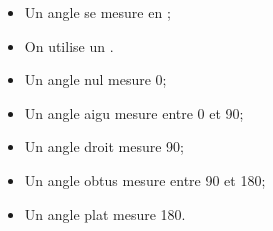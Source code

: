 \begin{mydef}
	\begin{itemize}
		\item Un angle se mesure en ;
		\item On utilise un .
		
	\end{itemize}
\end{mydef}

\begin{myexs}
	\begin{itemize}
		\item Un angle nul mesure 0\degree;
		\item Un angle aigu mesure entre 0 et 90\degree;
		\item Un angle droit mesure 90\degree;
		\item Un angle obtus mesure entre 90 et 180\degree;
		\item Un angle plat mesure 180\degree.
	\end{itemize}
\end{myexs}